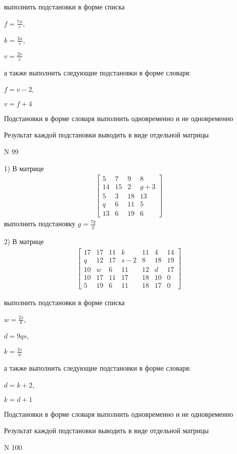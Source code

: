\documentclass[11pt]{report}
\begin{document}
выполнить подстановки в форме списка

$f=\frac{7 x}{c}$,

$k=\frac{2 x}{c}$,

$v=\frac{2 x}{v}$

а также выполнить следующие подстановки в форме словаря:

$f=v - 2$,

$v=f + 4$


    Подстановки в форме словаря выполнить одновременно и не одновременно


    Результат каждой подстановки выводить в виде отдельной матрицы

\newpage
N 99


    1) В матрице
\begin{align*}
\left[\begin{matrix}5 & 7 & 9 & 8\\14 & 15 & 2 & g + 3\\5 & 3 & 18 & 13\\q & 6 & 11 & 5\\13 & 6 & 19 & 6\end{matrix}\right]
\end{align*}
выполнить подстановку $g=\frac{7 q}{g}$


    2) В матрице
\begin{align*}
\left[\begin{matrix}17 & 17 & 11 & k & 11 & 4 & 14\\q & 12 & 17 & s - 2 & 8 & 18 & 19\\10 & w & 6 & 11 & 12 & d & 17\\10 & 17 & 11 & 17 & 18 & 10 & 0\\5 & 19 & 6 & 11 & 18 & 17 & 0\end{matrix}\right]
\end{align*}

выполнить подстановки в форме списка

$w=\frac{2 s}{k}$,

$d=9 q s$,

$k=\frac{2 s}{w}$

а также выполнить следующие подстановки в форме словаря:

$d=k + 2$,

$k=d + 1$


    Подстановки в форме словаря выполнить одновременно и не одновременно


    Результат каждой подстановки выводить в виде отдельной матрицы

\newpage
N 100
\end{document}
